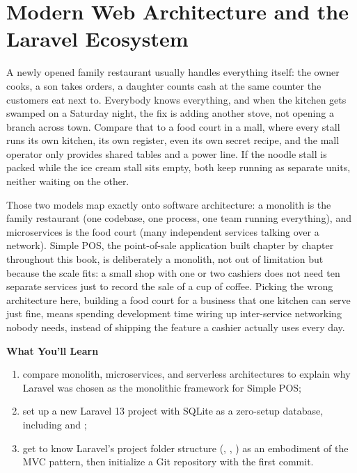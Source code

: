 
\chapter{Modern Web Architecture and the Laravel Ecosystem}
\label{ch:arsitektur-web-modern}


A newly opened family restaurant usually handles everything itself: the
owner cooks, a son takes orders, a daughter counts cash at the same counter
the customers eat next to. Everybody knows everything, and when the kitchen
gets swamped on a Saturday night, the fix is adding another stove, not
opening a branch across town. Compare that to a food court in a mall, where
every stall runs its own kitchen, its own register, even its own secret
recipe, and the mall operator only provides shared tables and a power line.
If the noodle stall is packed while the ice cream stall sits empty, both
keep running as separate units, neither waiting on the other.

Those two models map exactly onto software architecture: a monolith is the
family restaurant (one codebase, one process, one team running everything),
and microservices is the food court (many independent services talking
over a network). Simple POS, the point-of-sale application built chapter by
chapter throughout this book, is deliberately a monolith, not out of
limitation but because the scale fits: a small shop with one or two
cashiers does not need ten separate services just to record the sale of a
cup of coffee. Picking the wrong architecture here, building a food court
for a business that one kitchen can serve just fine, means spending
development time wiring up inter-service networking nobody needs, instead
of shipping the feature a cashier actually uses every day.

\textbf{What You'll Learn}

\begin{enumerate}
  \item compare monolith, microservices, and serverless architectures to explain why Laravel was chosen as the monolithic framework for Simple POS;
  \item set up a new Laravel 13 project with SQLite as a zero-setup database, including  and ;
  \item get to know Laravel's project folder structure (, , ) as an embodiment of the MVC pattern, then initialize a Git repository with the first  commit.
\end{enumerate}


